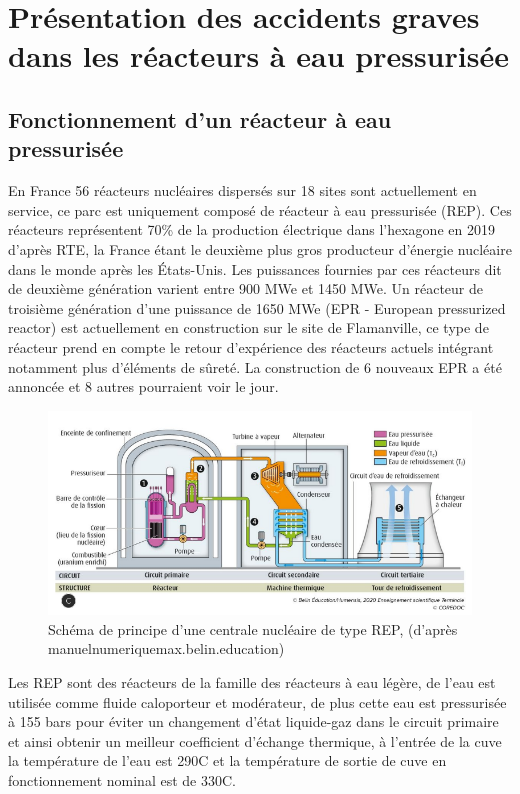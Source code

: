 \chapter{Présentation des accidents graves dans les réacteurs à eau pressurisée}
\section{Fonctionnement d'un réacteur à eau pressurisée}

En France 56 réacteurs nucléaires dispersés sur 18 sites sont actuellement en service, ce parc est uniquement composé de réacteur à eau pressurisée (REP). Ces réacteurs représentent 70\% de la production électrique dans l'hexagone en 2019 d'après RTE, la France étant le deuxième plus gros producteur d'énergie nucléaire dans le monde après les États-Unis. Les puissances fournies par ces réacteurs dit de deuxième génération varient entre 900 MWe et 1450 MWe. Un réacteur de troisième génération d'une puissance de 1650 MWe (EPR - European pressurized reactor) est actuellement en construction sur le site de Flamanville, ce type de réacteur prend en compte le retour d'expérience des réacteurs actuels intégrant notamment plus d'éléments de sûreté. La construction de 6 nouveaux EPR a été annoncée et 8 autres pourraient voir le jour. \\

\begin{figure}[h!]
	\centering
	\includegraphics[width=0.8\linewidth]{figure/sch_centrale1}
	\caption[Schéma de principe d'une centrale nucléaire de type REP]{Schéma de principe d'une centrale nucléaire de type REP, (d'après manuelnumeriquemax.belin.education)}
	\label{fig:schcentrale1}
\end{figure} 
Les REP sont des réacteurs de la famille des réacteurs à eau légère, de l'eau est utilisée comme fluide caloporteur et modérateur, de plus cette eau est pressurisée à 155 bars pour éviter un changement d'état liquide-gaz dans le circuit primaire et ainsi obtenir un meilleur coefficient d'échange thermique, à l'entrée de la cuve la température de l'eau est 290\textdegree C et la température de sortie de cuve en fonctionnement nominal est de 330\textdegree C.

